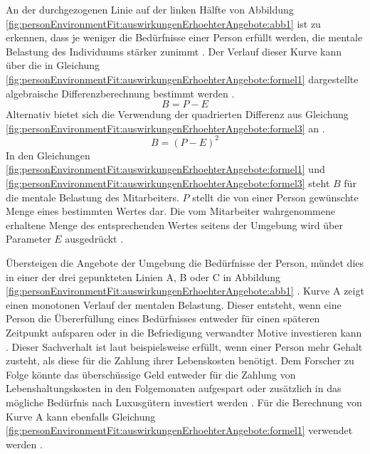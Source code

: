 An der durchgezogenen Linie auf der linken Hälfte von Abbildung \ref{fig:personEnvironmentFit:auswirkungenErhoehterAngebote:abb1} ist zu erkennen, dass je weniger die Bedürfnisse einer Person erfüllt werden, die mentale Belastung des Individuums stärker zunimmt \cite[S. 30]{mechanismsOfJobStressAndStrain:1982}. Der Verlauf dieser Kurve kann über die in Gleichung \ref{fig:personEnvironmentFit:auswirkungenErhoehterAngebote:formel1} dargestellte algebraische Differenzberechnung bestimmt werden \cite[S. 2]{edwards:1993}.
\begin{equation}
	B = P - E
	\label{fig:personEnvironmentFit:auswirkungenErhoehterAngebote:formel1}
\end{equation}
Alternativ bietet sich die Verwendung der quadrierten Differenz aus Gleichung \ref{fig:personEnvironmentFit:auswirkungenErhoehterAngebote:formel3} an \cite[S. 2]{edwards:1993}.
\begin{equation}
	B = (P - E)^2
	\label{fig:personEnvironmentFit:auswirkungenErhoehterAngebote:formel3}
\end{equation}
In den Gleichungen \ref{fig:personEnvironmentFit:auswirkungenErhoehterAngebote:formel1} und \ref{fig:personEnvironmentFit:auswirkungenErhoehterAngebote:formel3} steht $B$ für die mentale Belastung des Mitarbeiters. $P$ stellt die von einer Person gewünschte Menge eines bestimmten Wertes dar. Die vom Mitarbeiter wahrgenommene erhaltene Menge des entsprechenden Wertes seitens der Umgebung wird über Parameter $E$ ausgedrückt \cite[S. 2]{edwards:1993}.

Übersteigen die Angebote der Umgebung die Bedürfnisse der Person, mündet dies in einer der drei gepunkteten Linien A, B oder C in Abbildung \ref{fig:personEnvironmentFit:auswirkungenErhoehterAngebote:abb1} \cite[S. 29ff.]{mechanismsOfJobStressAndStrain:1982}. Kurve A zeigt einen monotonen Verlauf der mentalen Belastung. Dieser entsteht, wenn eine Person die Übererfüllung eines Bedürfnisses entweder für einen späteren Zeitpunkt aufsparen oder in die Befriedigung verwandter Motive investieren kann \cite[S. 11]{harrison:1978}. Dieser Sachverhalt ist laut \textcite[S. 21]{edwards:2008} beispielsweise erfüllt, wenn einer Person mehr Gehalt zusteht, als diese für die Zahlung ihrer Lebenskosten benötigt. Dem Forscher zu Folge könnte das überschüssige Geld entweder für die Zahlung von Lebenshaltungskosten in den Folgemonaten aufgespart oder zusätzlich in das mögliche Bedürfnis nach Luxusgütern investiert werden \cite[S. 30]{mechanismsOfJobStressAndStrain:1982}. Für die Berechnung von Kurve A kann ebenfalls Gleichung \ref{fig:personEnvironmentFit:auswirkungenErhoehterAngebote:formel1} verwendet werden \cite[S. 2]{edwards:1993}.


